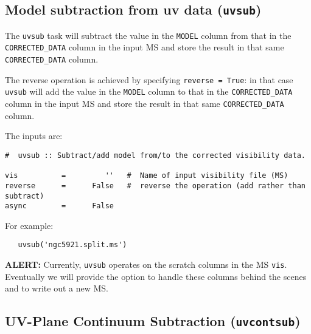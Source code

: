 \subsection{Model subtraction from uv data ({\tt uvsub})}
\label{section:cal.other.uvsub}

The {\tt uvsub} task will subtract the value in the {\tt MODEL} column
from that in the {\tt CORRECTED\_DATA} column in the input MS and
store the result in that same {\tt CORRECTED\_DATA} column.

The reverse operation is achieved by specifying {\tt reverse = True}:
in that case {\tt uvsub} will add the value in the {\tt MODEL} column
to that in the {\tt CORRECTED\_DATA} column in the input MS and store
the result in that same {\tt CORRECTED\_DATA} column.

The inputs are:

\small
\begin{verbatim}
#  uvsub :: Subtract/add model from/to the corrected visibility data.

vis          =         ''   #  Name of input visibility file (MS)
reverse      =      False   #  reverse the operation (add rather than subtract)
async        =      False   
\end{verbatim}
\normalsize

For example:
\small
\begin{verbatim}
   uvsub('ngc5921.split.ms')
\end{verbatim}
\normalsize

{\bf ALERT:} Currently, {\tt uvsub} operates on the scratch
columns in the MS {\tt vis}.  Eventually we will provide the option to
handle these columns behind the scenes and to write out a new MS.

\subsection{UV-Plane Continuum Subtraction ({\tt uvcontsub})}
\label{section:cal.other.uvcontsub}

